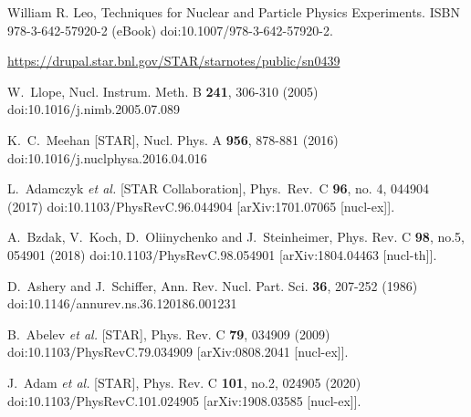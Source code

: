 \begin{thebibliography}{99}
William R. Leo, Techniques for Nuclear and Particle Physics Experiments. 
 ISBN 978-3-642-57920-2 (eBook)
  doi:10.1007/978-3-642-57920-2.
  
 \url{ https://drupal.star.bnl.gov/STAR/starnotes/public/sn0439}

W.~Llope,
Nucl. Instrum. Meth. B \textbf{241}, 306-310 (2005)
doi:10.1016/j.nimb.2005.07.089 



K.~C.~Meehan [STAR],
Nucl. Phys. A \textbf{956}, 878-881 (2016)
doi:10.1016/j.nuclphysa.2016.04.016

 
  L.~Adamczyk {\it et al.} [STAR Collaboration],
  Phys.\ Rev.\ C {\bf 96}, no. 4, 044904 (2017)
  doi:10.1103/PhysRevC.96.044904
  [arXiv:1701.07065 [nucl-ex]].
 
 
A.~Bzdak, V.~Koch, D.~Oliinychenko and J.~Steinheimer,
Phys. Rev. C \textbf{98}, no.5, 054901 (2018)
doi:10.1103/PhysRevC.98.054901
[arXiv:1804.04463 [nucl-th]].


D.~Ashery and J.~Schiffer,
Ann. Rev. Nucl. Part. Sci. \textbf{36}, 207-252 (1986)
doi:10.1146/annurev.ns.36.120186.001231

B.~Abelev \textit{et al.} [STAR],
Phys. Rev. C \textbf{79}, 034909 (2009)
doi:10.1103/PhysRevC.79.034909
[arXiv:0808.2041 [nucl-ex]].

J.~Adam \textit{et al.} [STAR],
Phys. Rev. C \textbf{101}, no.2, 024905 (2020)
doi:10.1103/PhysRevC.101.024905
[arXiv:1908.03585 [nucl-ex]].
 

\end{thebibliography}
